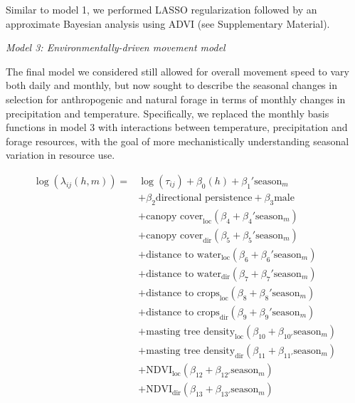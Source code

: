\documentclass[a4paper]{article}
\begin{document}
Similar to model 1, we performed LASSO regularization followed by an approximate Bayesian analysis using ADVI (see Supplementary Material).

\bigskip
\noindent
\emph{Model 3: Environmentally-driven movement model}

The final model we considered still allowed for overall movement speed to vary both daily and monthly, but now sought to describe the seasonal changes in selection for anthropogenic and natural forage in terms of monthly changes in precipitation and temperature.  Specifically, we replaced the monthly basis functions in model 3 with interactions between temperature, precipitation and forage resources, with the goal of more mechanistically understanding seasonal variation in resource use. 

\begin{align*}
  \log(\lambda_{ij}(h, m)) = & \log(\tau_{ij}) + \beta_0(h) + \beta_1' \text{season}_m \\
  & + \beta_2 \text{directional persistence} + \beta_3 \text{male  } \\
  & + \text{canopy cover}_{\text{loc}}(\beta_4 + \beta_4' \text{season}_m) \\
  & + \text{canopy cover}_{\text{dir}}(\beta_5 + \beta_5' \text{season}_m) \\
  & + \text{distance to water}_{\text{loc}}(\beta_6 + \beta_6' \text{season}_m) \\
  & + \text{distance to water}_{\text{dir}}(\beta_7 + \beta_7' \text{season}_m) \\
  & + \text{distance to crops}_{\text{loc}}(\beta_8 + \beta_8' \text{season}_m) \\
  & + \text{distance to crops}_{\text{dir}}(\beta_9 + \beta_9' \text{season}_m) \\
  & + \text{masting tree density}_{\text{loc}}(\beta_{10} + \beta_{10'} \text{season}_m) \\
  & + \text{masting tree density}_{\text{dir}}(\beta_{11} + \beta_{11'} \text{season}_m) \\
  & + \text{NDVI}_{\text{loc}}(\beta_{12} + \beta_{12'} \text{season}_m) \\
  & + \text{NDVI}_{\text{dir}}(\beta_{13} + \beta_{13'} \text{season}_m)
\end{align*}
\end{document}
